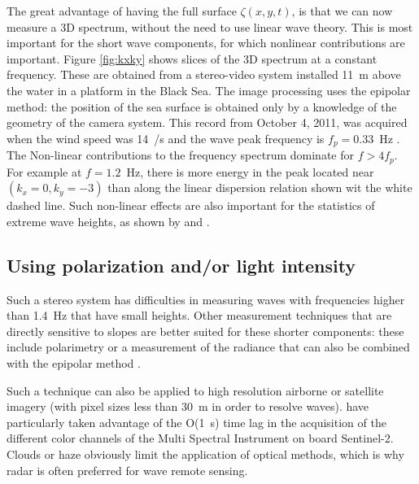 The great advantage of having the full surface $\zeta(x,y,t)$, is that we can now measure a 3D spectrum, without the need to use linear wave theory. 
This is most important for the short wave components, for which nonlinear contributions are important. Figure \ref{fig:kxky} shows slices of the 3D spectrum 
at a constant frequency. These are obtained from a stereo-video system installed 11~m above the water in a platform in the Black Sea. The image processing 
uses the epipolar method: the position of the sea surface is obtained only by a knowledge of the geometry of the camera system.
This record from October 4, 2011, was acquired when the wind speed was 14~/s and the wave  peak frequency is $f_p=0.33$~Hz \citep{Leckler&al.2015}. The 
Non-linear contributions to the frequency spectrum dominate for $f > 4 f_p$. For example at $f=1.2$~Hz, there is more energy in the peak located near $(k_x=0,k_y=-3)$ 
than along the linear dispersion relation shown wit the white dashed line. 
Such non-linear effects are also important for the statistics of extreme wave heights, as shown by \cite{Fedele&al.2013} and \cite{Benetazzo&al.2017}.



\subsection{Using polarization and/or light intensity}
Such a stereo system has difficulties in measuring waves with frequencies higher than 1.4~Hz that have small heights. Other measurement techniques that 
are directly sensitive to slopes are better suited for these shorter components: these include polarimetry \citep{Zappa&al.2008} or a measurement of 
the radiance that can also be combined with the epipolar method \citep{Gallego&al.2011,Yurovskaya&al.2013}. 

Such a technique can also be applied to high resolution airborne or satellite imagery (with pixel sizes less than 30~m in order to resolve waves). 
\cite{Kudryavtsev&al.2017} have particularly taken advantage of the O(1~s) time lag in the acquisition of the different color channels of the Multi Spectral Instrument 
on board Sentinel-2. Clouds or haze obviously limit the application of optical methods, which is why radar is often preferred for wave remote sensing. 



